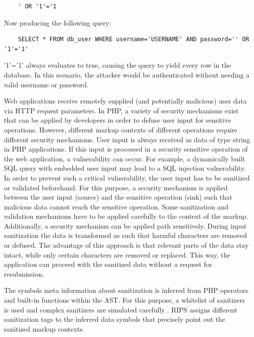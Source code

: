 \begin{lstlisting}
	' OR '1'='1
\end{lstlisting}

Now producing the following query:

\begin{lstlisting}
	SELECT * FROM db_user WHERE username='USERNAME' AND password='' OR '1'='1'
\end{lstlisting}
'1'='1' always evaluates to true, causing the query to yield every row in the database. In this scenario, the attacker would be authenticated without needing a valid username or password.

Web applications receive remotely supplied (and potentially
malicious) user data via HTTP request parameters. In PHP, a variety of security mechanisms exist that can be applied by developers in order to defuse user input for sensitive operations. However, different markup contexts of different operations require different security mechanisms.
User input is always received as data of type string in PHP applications. If this input is processed in a security sensitive 
operation of the web application, a vulnerability can
occur. For example, a dynamically built SQL query with
embedded user input may lead to a SQL injection vulnerability. In order to prevent such a critical vulnerability, the
user input has to be sanitized or validated beforehand. For
this purpose, a security mechanism is applied between the
user input (source) and the sensitive operation (sink) such
that malicious data cannot reach the sensitive operation.
Some sanitization and validation mechanisms have to be applied carefully to the context of the markup. Additionally, a security mechanism can be applied path sensitively. During input sanitization the data is
transformed as such that harmful characters are removed or defused.
The advantage of this approach is that relevant parts of the data stay intact, while only certain characters are removed
or replaced. This way, the application can proceed
with the sanitized data without a request for resubmission.

The symbols meta information about sanitization is inferred
from PHP operators and built-in functions within the
AST. For this purpose, a whitelist of sanitizers is used and
complex sanitizers are simulated carefully \cite{ref_93_dahse2014simulation}. RIPS assigns
different sanitization tags to the inferred data symbols that
precisely point out the sanitized markup contexts.

